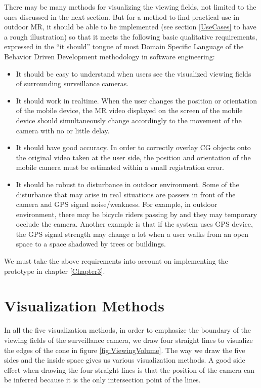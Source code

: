 There may be many methods for visualizing the viewing fields, not limited to the ones discussed in the next section. But for a method to find practical use in outdoor MR, it should be able to be implemented (see section \ref{UseCases} to have a rough illustration) so that it meets the following basic qualitative requirements, expressed in the ``it should'' tongue of most Domain Specific Language of the Behavior Driven Development methodology in software engineering:

\begin{itemize}
	\item It should be easy to understand when users see the visualized viewing fields of surrounding surveillance cameras.
	\item It should work in realtime. When the user changes the position or orientation of the mobile device, the MR video displayed on the screen of the mobile device should simultaneously change accordingly to the movement of the camera with no or little delay.
	\item It should have good accuracy. In order to correctly overlay CG objects onto the original video taken at the user side, the position and orientation of the mobile camera must be estimated within a small registration error.
	\item It should be robust to disturbance in outdoor environment. Some of the disturbance that may arise in real situations are passers in front of the camera and GPS signal noise/weakness. For example, in outdoor environment, there may be bicycle riders passing by and they may temporary occlude the camera. Another example is that if the system uses GPS device, the GPS signal strength may change a lot when a user walks from an open space to a space shadowed by trees or buildings.
\end{itemize}

We must take the above requirements into account on implementing the prototype in chapter \ref{Chapter3}.


\section{Visualization Methods}
\label{VisualizationMethods}

In all the five visualization methods, in order to emphasize the boundary of the viewing fields of the surveillance camera, we draw four straight lines to visualize the edges of the cone in figure \ref{fig:ViewingVolume}. The way we draw the five sides and the inside space gives us various visualization methods. A good side effect when drawing the four straight lines is that the position of the camera can be inferred because it is the only intersection point of the lines.

